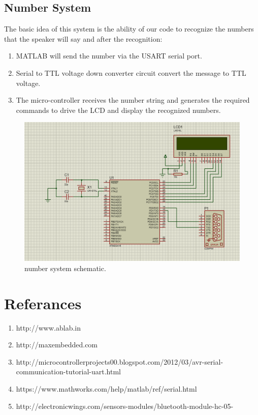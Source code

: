 \documentclass[12pt, a4paper, twoside]{report}
\begin{document}
\subsection{Number System}
The basic idea of this system is the ability of our code to recognize the numbers that the speaker will say and after the recognition:
\begin{enumerate}
\item MATLAB will send the number via the USART serial port.
\item Serial to TTL voltage down converter circuit convert the message to TTL voltage.
\item The micro-controller receives the number string and generates the required commands to drive the LCD and display the recognized numbers.
\end{enumerate}
\begin{figure}[!h]
	\centering
	\includegraphics[width=1\textwidth]
	{images/chapter6/hardware-6}
	\caption{number system schematic.}
	\label{fig:hardware-6}
\end{figure}


\section*{Referances}
\begin{enumerate}
\item http://www.ablab.in
\item http://maxembedded.com
\item http://microcontrollerprojects00.blogspot.com/2012/03/avr-serial-communication-tutorial-uart.html
\item https://www.mathworks.com/help/matlab/ref/serial.html
\item http://electronicwings.com/sensors-modules/bluetooth-module-hc-05-
\end{enumerate}
\end{document}
